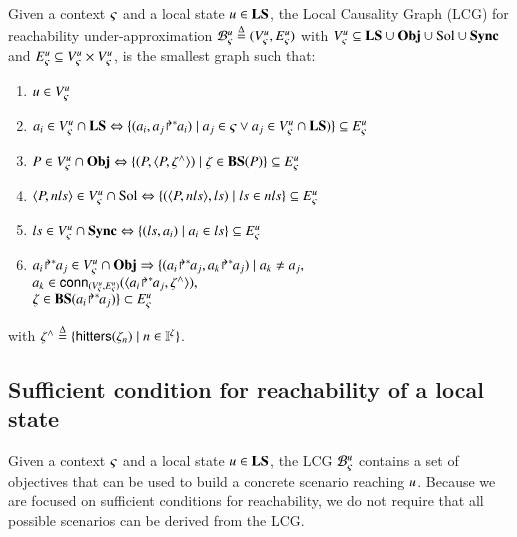 \begin{definition}
\label{def:lcg}
Given a context $\varsigma$ and a local state $u\in \mathbf{LS}$,
the Local Causality Graph (LCG) for reachability under-approximation
${\mathcal{B}_{\varsigma}^{u}} \stackrel{\Delta}= ({V_\varsigma^u}, {E_\varsigma^u})$
with
${V_\varsigma^u} \subseteq \mathbf{LS} \cup \mathbf{Obj} \cup \mathrm{Sol} \cup \mathbf{Sync}$
and
${E_\varsigma^u} \subseteq {V_\varsigma^u} \times {V_\varsigma^u}$,
is the smallest graph such that:
\begin{enumerate}
\item
$u \in {V_\varsigma^u}$
\item
$a_i\in{V_\varsigma^u}\cap\mathbf{LS} \Leftrightarrow \{ (a_i,{a_j\!\Rsh^*\!\!a_i}) \mid
a_j\in\varsigma \vee a_j\in{V_\varsigma^u}\cap\mathbf{LS})
\}\subseteq{E_\varsigma^u}$
\label{lcg-ls-obj}
\item
$P\in{V_\varsigma^u}\cap\mathbf{Obj} \Leftrightarrow 
	\{ (P,\langle P,\zeta^\wedge\rangle) \mid \zeta\in\mathbf{BS}(P) \}\subseteq{E_\varsigma^u}$
\label{lcg-obj-sol}
\item
$\langle P, nls \rangle\in{V_\varsigma^u}\cap\mathrm{Sol} \Leftrightarrow
	\{ (\langle P,nls\rangle, ls) \mid ls\in nls \}\subseteq{E_\varsigma^u}$
\label{lcg-sol-sync}
\item
$ls \in{V_\varsigma^u}\cap\mathbf{Sync} \Leftrightarrow
	\{ (ls, a_i) \mid a_i\in ls \}\subseteq{E_\varsigma^u}$
\label{lcg-sync-ls}
\item
$\obj{a_i}{a_j}\in \cwBNodes\cap\Obj \Rightarrow 
	\{(\obj{a_i}{a_j},\obj{a_k}{a_j}) \mid a_k\neq a_j,$
\label{lcg-conn}
\\
\hspace*{4cm}
$a_k\in \mathsf{conn}_{({V_\varsigma^u},{E_\varsigma^u})}(\langle{a_i\!\Rsh^*\!\!a_j},\zeta^\wedge\rangle),$
\\
\hspace*{4cm}
$\zeta\in\mathbf{BS}({a_i\!\Rsh^*\!\!a_j}) \}\subset{E_\varsigma^u}$
\end{enumerate}
with $\zeta^\wedge \stackrel{\Delta}= \{\mathsf{hitters}(\zeta_n) \mid n\in\mathbb{I}^{\zeta} \}$.
\end{definition}



\subsection{Sufficient condition for reachability of a local state}
\label{ssec:ua}

Given a context $\varsigma$ and a local state $u\in\mathbf{LS}$, the LCG ${\mathcal{B}_{\varsigma}^{u}}$ contains a set of objectives
that can be used to build a concrete scenario reaching $u$.
Because we are focused on sufficient conditions for reachability, we do not require that all
possible scenarios can be derived from the LCG.

